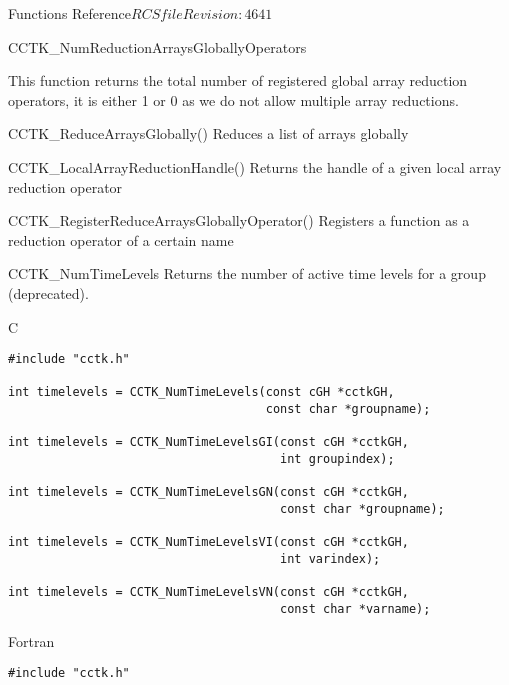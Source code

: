 \begin{cactuspart}{ Functions Reference}{$RCSfile$}{$Revision: 4641 $}
\begin{FunctionDescription}{CCTK\_NumReductionArraysGloballyOperators}

\begin{Discussion}
This function returns the total number of registered global array
reduction operators, it is either 1 or 0 as we do not allow multiple
array reductions.
\end{Discussion}

\begin{SeeAlsoSection}
\begin{SeeAlso}{CCTK\_ReduceArraysGlobally()}
Reduces a list of arrays globally
\end{SeeAlso}

\begin{SeeAlso}{CCTK\_LocalArrayReductionHandle()}
Returns the handle of a given local array reduction operator
\end{SeeAlso}

\begin{SeeAlso}{CCTK\_RegisterReduceArraysGloballyOperator()}
Registers a function as a reduction operator of a certain name
\end{SeeAlso}

\end{SeeAlsoSection}
\end{FunctionDescription}


\begin{FunctionDescription}{CCTK\_NumTimeLevels}
\label{CCTK-NumTimeLevels}
Returns the number of active time levels for a group (deprecated).

\begin{SynopsisSection}
\begin{Synopsis}{C}
\begin{verbatim}
#include "cctk.h"

int timelevels = CCTK_NumTimeLevels(const cGH *cctkGH,
                                    const char *groupname);

int timelevels = CCTK_NumTimeLevelsGI(const cGH *cctkGH,
                                      int groupindex);

int timelevels = CCTK_NumTimeLevelsGN(const cGH *cctkGH,
                                      const char *groupname);

int timelevels = CCTK_NumTimeLevelsVI(const cGH *cctkGH,
                                      int varindex);

int timelevels = CCTK_NumTimeLevelsVN(const cGH *cctkGH,
                                      const char *varname);
\end{verbatim}
\end{Synopsis}
\begin{Synopsis}{Fortran}
\begin{verbatim}
#include "cctk.h"


\end{verbatim}
\end{Synopsis}
\end{SynopsisSection}
\end{FunctionDescription}
\end{cactuspart}
